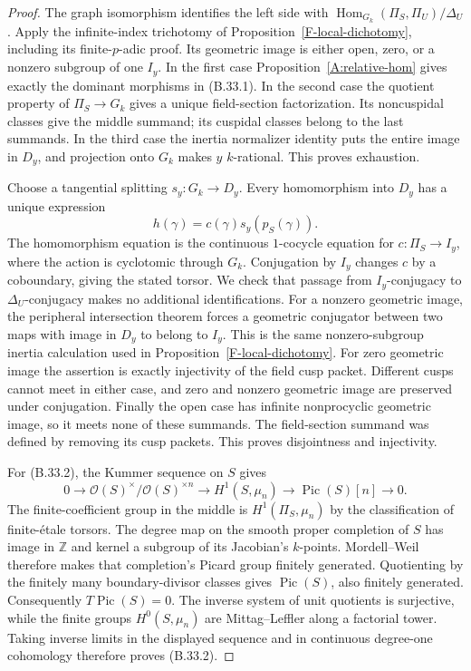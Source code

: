 \begin{proof}
The graph isomorphism identifies the left side with
$\operatorname{Hom}_{G_k}(\Pi_S,\Pi_U)/\Delta_U$.
Apply the infinite-index trichotomy of
Proposition~\ref{F-local-dichotomy}, including its
finite-$p$-adic proof. Its geometric image is either
open, zero, or a nonzero subgroup of one $I_y$.
In the first case Proposition~\ref{A:relative-hom}
gives exactly the dominant morphisms in (B.33.1).
In the second case the quotient property of
$\Pi_S\to G_k$ gives a unique field-section
factorization. Its noncuspidal classes give the
middle summand; its cuspidal classes belong to the
last summands. In the third case the inertia
normalizer identity puts the entire image in
$D_y$, and projection onto $G_k$ makes $y$
$k$-rational. This proves exhaustion.

Choose a tangential splitting $s_y:G_k\to D_y$.
Every homomorphism into $D_y$ has a unique expression
\[
 h(\gamma)=c(\gamma)s_y(p_S(\gamma)).
\]
The homomorphism equation is the continuous
$1$-cocycle equation for $c:\Pi_S\to I_y$, where
the action is cyclotomic through $G_k$.
Conjugation by $I_y$ changes $c$ by a coboundary,
giving the stated torsor.
We check that passage from $I_y$-conjugacy to
$\Delta_U$-conjugacy makes no additional
identifications. For a nonzero geometric image,
the peripheral intersection theorem forces a
geometric conjugator between two maps with image
in $D_y$ to belong to $I_y$. This is the same
nonzero-subgroup inertia calculation used in
Proposition~\ref{F-local-dichotomy}.
For zero geometric image the assertion is exactly
injectivity of the field cusp packet. Different
cusps cannot meet in either case, and zero and
nonzero geometric image are preserved under
conjugation. Finally the open case has infinite
nonprocyclic geometric image, so it meets none
of these summands. The field-section summand
was defined by removing its cusp packets.
This proves disjointness and injectivity.

For (B.33.2), the Kummer sequence on $S$ gives
\[
 0\to\mathcal O(S)^\times/\mathcal O(S)^{\times n}
   \to H^1(S,\mu_n)\to\operatorname{Pic}(S)[n]\to0.
\]
The finite-coefficient group in the middle is
$H^1(\Pi_S,\mu_n)$ by the classification of
finite-\'etale torsors. The degree map on the
smooth proper completion of $S$ has image in
$\mathbb Z$ and kernel a subgroup of its
Jacobian's $k$-points. Mordell--Weil therefore
makes that completion's Picard group finitely
generated. Quotienting by the finitely many
boundary-divisor classes gives
$\operatorname{Pic}(S)$, also finitely generated.
Consequently $T\operatorname{Pic}(S)=0$.
The inverse system of unit quotients is
surjective, while the finite groups
$H^0(S,\mu_n)$ are Mittag--Leffler along a
factorial tower. Taking inverse limits in the
displayed sequence and in continuous degree-one
cohomology therefore proves (B.33.2).


\end{proof}
